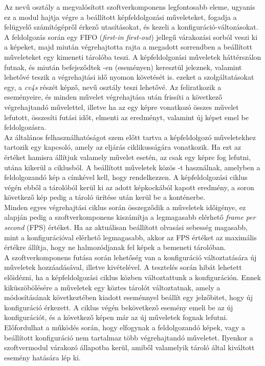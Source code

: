 Az  nevű osztály a megvalósított szoftverkomponens legfontosabb eleme, ugyanis ez a modul hajtja végre a beállított képfeldolgozási műveleteket, fogadja a felügyelő számítógépről érkező utasításokat, és kezeli a konfiguráció-változásokat. \\
A feldolgozás során egy FIFO (\textit{first-in first-out}) jellegű várakozási sorból veszi ki a képeket, majd miután végrehajtotta rajta a megadott sorrendben a beállított műveleteket egy kimeneti tárolóba teszi. A képfeldolgozási műveletek háttérszálon futnak, és miután befejeződtek -en (eseményen) keresztül jeleznek, valamint lehetővé teszik a végrehajtási idő nyomon követését is. ezeket a szolgáltatásokat egy, a \emph{cv4s} részét képző,  nevű osztály teszi lehetővé. Az  feliratkozik a  eseményeire, és minden művelet végrehajtása után frissíti a következő végrehajtandó művelettel, illetve ha az egy képre vonatkozó összes művelet lefutott, összesíti futási időt, elmenti az eredményt, valamint új képet emel be feldolgozásra.\\
Az általános felhasználhatóságot szem előtt tartva a képfeldolgozó műveletekhez tartozik egy  kapcsoló, amely az eljárás ciklikusságára vonatkozik. Ha ezt az értéket hamisra állítjuk valamely művelet esetén, az csak egy képre fog lefutni, utána kikerül a ciklusból.
A beállított műveletek közös -t használnak, amelyben a feldolgozandó kép a  címkével kell, hogy rendelkezzen. A képfeldolgozási ciklus végén ebből a tárolóból kerül ki az adott képkockából kapott eredmény, a soron következő kép pedig a tároló ürítése után kerül be a konténerbe. \\
Minden egyes végrehajtási ciklus során összegződik a műveletek időigénye, ez alapján pedig a szoftverkomponens kiszámítja a legmagasabb elérhető \emph{frame per second} (FPS) értéket. Ha az aktuálisan beállított olvasási sebesség magasabb, mint a konfigurációval elérhető legmagasabb, akkor az FPS értéket az maximális értékre állítja, hogy ne halmozódjanak fel képek a bemeneti tárolóban.\\
A szoftverkomponens futása során lehetőség van a konfiguráció változtatására új műveletek hozzáadásával, illetve kivételével. A tesztelés során hibát lehetett előidézni, ha a képfeldolgozási ciklus közben változtattunk a konfiguráción. Ennek kiküszöbölésére a műveletek egy köztes tárolót változtatnak, amely a módosításának következtében kiadott eseménnyel beállít egy jelzőbitet, hogy új konfiguráció érkezett. A ciklus végén bekövetkező esemény emeli be az új konfigurációt, és a következő képen már az új műveletek fognak lefutni.\\
Előfordulhat a működés során, hogy elfogynak a feldolgozandó képek, vagy a beállított konfiguráció nem tartalmaz több végrehajtandó műveletet. Ilyenkor a szoftvermodul várakozó állapotba kerül, amiből valamelyik tároló által kiváltott esemény hatására lép ki.

